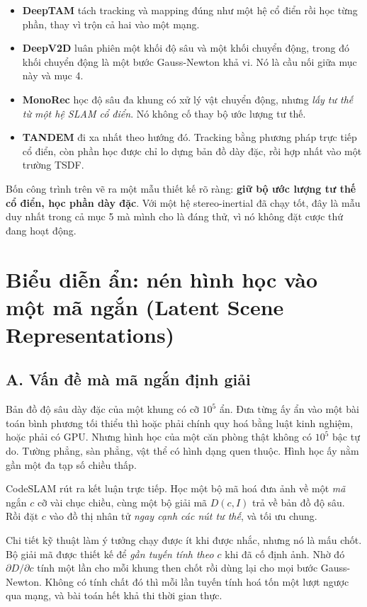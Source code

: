\documentclass[../../deep_learning.tex]{subfiles}
\begin{document}
\begin{itemize}
\item \textbf{DeepTAM} \cite{zhou2018deeptam} tách tracking và mapping đúng như một hệ cổ điển rồi học từng phần, thay vì trộn cả hai vào một mạng.
\item \textbf{DeepV2D} \cite{teed2020deepv2d} luân phiên một khối độ sâu và một khối chuyển động, trong đó khối chuyển động là một bước Gauss-Newton khả vi. Nó là cầu nối giữa mục này và mục 4.
\item \textbf{MonoRec} \cite{wimbauer2021monorec} học độ sâu đa khung có xử lý vật chuyển động, nhưng \emph{lấy tư thế từ một hệ SLAM cổ điển}. Nó không cố thay bộ ước lượng tư thế.
\item \textbf{TANDEM} \cite{koestler2021tandem} đi xa nhất theo hướng đó. Tracking bằng phương pháp trực tiếp cổ điển, còn phần học được chỉ lo dựng bản đồ dày đặc, rồi hợp nhất vào một trường TSDF.
\end{itemize}

Bốn công trình trên vẽ ra một mẫu thiết kế rõ ràng: \textbf{giữ bộ ước lượng tư thế cổ điển, học phần dày đặc}. Với một hệ stereo-inertial đã chạy tốt, đây là mẫu duy nhất trong cả mục 5 mà mình cho là đáng thử, vì nó không đặt cược thứ đang hoạt động.

\section{Biểu diễn ẩn: nén hình học vào một mã ngắn (Latent Scene Representations)}

\subsection{A. Vấn đề mà mã ngắn định giải}
Bản đồ độ sâu dày đặc của một khung có cỡ \(10^5\) ẩn. Đưa từng ấy ẩn vào một bài toán bình phương tối thiểu thì hoặc phải chính quy hoá bằng luật kinh nghiệm, hoặc phải có GPU. Nhưng hình học của một căn phòng thật không có \(10^5\) bậc tự do. Tường phẳng, sàn phẳng, vật thể có hình dạng quen thuộc. Hình học ấy nằm gần một đa tạp số chiều thấp.

CodeSLAM \cite{bloesch2018codeslam} rút ra kết luận trực tiếp. Học một bộ mã hoá đưa ảnh về một \emph{mã} ngắn \(c\) cỡ vài chục chiều, cùng một bộ giải mã \(D(c, I)\) trả về bản đồ độ sâu. Rồi đặt \(c\) vào đồ thị nhân tử \emph{ngay cạnh các nút tư thế}, và tối ưu chung.

Chi tiết kỹ thuật làm ý tưởng chạy được ít khi được nhắc, nhưng nó là mấu chốt. Bộ giải mã được thiết kế để \emph{gần tuyến tính theo \(c\)} khi đã cố định ảnh. Nhờ đó \(\partial D/\partial c\) tính một lần cho mỗi khung then chốt rồi dùng lại cho mọi bước Gauss-Newton. Không có tính chất đó thì mỗi lần tuyến tính hoá tốn một lượt ngược qua mạng, và bài toán hết khả thi thời gian thực.
\end{document}
